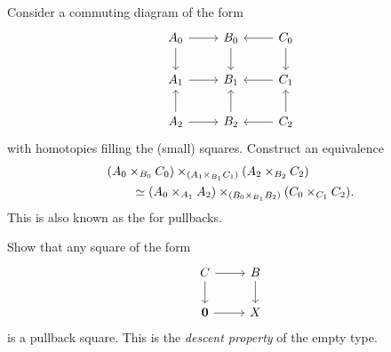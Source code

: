 \begin{exercises}
\begin{equation*}
\begin{tikzcd}[column sep=6.5em]
\end{tikzcd}
\end{equation*}
\item \label{ex:pb_3by3}Consider a commuting diagram of the form
\begin{equation*}
\begin{tikzcd}
A_0 \arrow[r] \arrow[d] & B_0 \arrow[d] & C_0 \arrow[l] \arrow[d] \\
A_1 \arrow[r] & B_1 & C_1 \arrow[l] \\
A_2 \arrow[u] \arrow[r] & B_2 \arrow[u] & C_2 \arrow[u] \arrow[l]
\end{tikzcd}
\end{equation*}
with homotopies filling the (small) squares. Construct an equivalence
\begin{align*}
& (A_0\times_{B_0} C_0) \times_{(A_1\times_{B_1} C_1)} (A_2\times_{B_2} C_2) \\
& \qquad \simeq (A_0\times_{A_1} A_2) \times_{(B_0\times_{B_1} B_2)} (C_0\times_{C_1} C_2).
\end{align*}
This is also known as the  for pullbacks.
\item Show that any square of the form
\begin{equation*}
\begin{tikzcd}
C \arrow[r] \arrow[d] & B \arrow[d] \\
\emptyt \arrow[r] & X
\end{tikzcd}
\end{equation*}
is a pullback square. This is the \emph{descent property} of the empty type.
\end{exercises}
